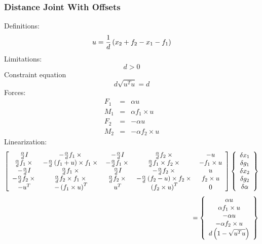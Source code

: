 \documentclass[10pt,dvips]{report}
\begin{document}
\subsubsection{Distance Joint With Offsets}
Definitions:
\begin{displaymath}
	u = \frac{1}{d}\plbr{x_2 + f_2 - x_1 - f_1}
\end{displaymath}
Limitations:
\begin{displaymath}
	d > 0
\end{displaymath}
Constraint equation 
\begin{displaymath}
	d \sqrt{u^T u} = d
\end{displaymath}
Forces:
\begin{eqnarray*}
	F_1 & = & \alpha u \\
	M_1 & = & \alpha f_1 \times u \\
	F_2 & = & -\alpha u \\
	M_2 & = & -\alpha f_2 \times u
\end{eqnarray*}
Linearization:
\begin{displaymath}
	\sqbr{\matr{ccccc}{
		\frac{\alpha}{d}I & -\frac{\alpha}{d}f_1\times{} &
			-\frac{\alpha}{d}I & \frac{\alpha}{d}f_2\times{} & -u \\
		\frac{\alpha}{d}f_1\times{} & 
			-\frac{\alpha}{d}\plbr{f_1 + u}\times{f_1\times{}} &
			-\frac{\alpha}{d}f_1\times{} & 
			\frac{\alpha}{d}f_1\times{f_2\times{}} & 
			-f_1\times{u} \\
		-\frac{\alpha}{d}I & \frac{\alpha}{d}f_1\times{} &
			\frac{\alpha}{d}I & -\frac{\alpha}{d}f_2\times{} & u \\
		-\frac{\alpha}{d}f_2\times{} &
			\frac{\alpha}{d}f_2\times{f_1\times{}} &
			\frac{\alpha}{d}f_2\times{} &
			- \frac{\alpha}{d}\plbr{f_2 - u}\times{f_2\times{}} &
			f_2\times{u} \\
		-u^T & - \plbr{f_1\times{u}}^T & 
			u^T & \plbr{f_2\times{u}}^T & 0
	}}\cubr{\cvvect{
		\delta{x_1} \\
		\delta{g_1} \\
		\delta{x_2} \\
		\delta{g_2} \\
		\delta{\alpha}
	}}
\end{displaymath}
\begin{displaymath}
	\mbox{\hspace{100mm}} = \cubr{\cvvect{
		\alpha u \\
		\alpha f_1\times{u} \\
		-\alpha u \\
		-\alpha f_2\times{u} \\
		d\plbr{1 - \sqrt{u^T u}}
	}}
\end{displaymath}
\end{document}
